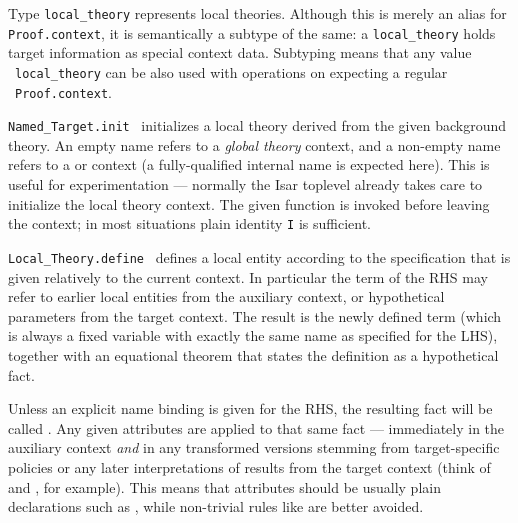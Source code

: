 \begin{isabellebody}
\begin{isamarkuptext}
  \begin{description}

  \item Type \verb|local_theory| represents local theories.
  Although this is merely an alias for \verb|Proof.context|, it is
  semantically a subtype of the same: a \verb|local_theory| holds
  target information as special context data.  Subtyping means that
  any value ~\verb|local_theory| can be also used
  with operations on expecting a regular ~\verb|Proof.context|.

  \item \verb|Named_Target.init|~
  initializes a local theory derived from the given background theory.
  An empty name refers to a \emph{global theory} context, and a
  non-empty name refers to a \hyperlink{command.locale}{\mbox{}} or \hyperlink{command.class}{\mbox{}}
  context (a fully-qualified internal name is expected here).  This is
  useful for experimentation --- normally the Isar toplevel already
  takes care to initialize the local theory context.  The given  function is invoked before leaving the context; in
  most situations plain identity \verb|I| is sufficient.

  \item \verb|Local_Theory.define|~ defines a local entity according to the specification that is
  given relatively to the current  context.  In
  particular the term of the RHS may refer to earlier local entities
  from the auxiliary context, or hypothetical parameters from the
  target context.  The result is the newly defined term (which is
  always a fixed variable with exactly the same name as specified for
  the LHS), together with an equational theorem that states the
  definition as a hypothetical fact.

  Unless an explicit name binding is given for the RHS, the resulting
  fact will be called .  Any given attributes are
  applied to that same fact --- immediately in the auxiliary context
  \emph{and} in any transformed versions stemming from target-specific
  policies or any later interpretations of results from the target
  context (think of \hyperlink{command.locale}{\mbox{}} and \hyperlink{command.interpretation}{\mbox{}},
  for example).  This means that attributes should be usually plain
  declarations such as \hyperlink{attribute.simp}{\mbox{}}, while non-trivial rules like
  \hyperlink{attribute.simplified}{\mbox{}} are better avoided.


\end{description}
\end{isamarkuptext}
\end{isabellebody}
